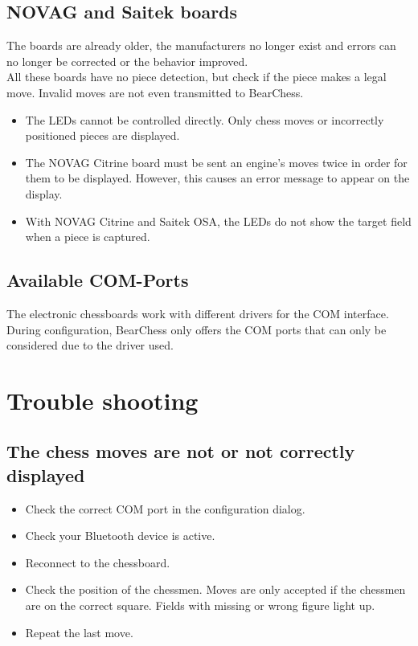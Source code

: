 \documentclass[11pt,a4paper]{article}
\begin{document}
\subsection{NOVAG and Saitek boards}
The boards are already older, the manufacturers no longer exist and errors can no longer be corrected or the behavior improved.\\
All these boards have no piece detection, but check if the piece makes a legal move. Invalid moves are not even transmitted to BearChess.
\begin{itemize}
	\item The LEDs cannot be controlled directly. Only chess moves or incorrectly positioned pieces are displayed.
	\item The NOVAG Citrine board must be sent an engine's moves twice in order for them to be displayed. However, this causes an error message to appear on the display.
	\item With NOVAG Citrine and Saitek OSA, the LEDs do not show the target field when a piece is captured.
\end{itemize}

\subsection{Available COM-Ports}
The electronic chessboards work with different drivers for the COM interface. During configuration, BearChess only offers the COM ports that can only be considered due to the driver used.

\section{Trouble shooting}

\subsection{The chess moves are not or not correctly displayed}
\begin{itemize}
	\item Check the correct COM port in the configuration dialog.
	\item Check your Bluetooth device is active.	
	\item Reconnect to the chessboard.	
	\item Check the position of the chessmen. Moves are only accepted if the chessmen are on the correct square. Fields with missing or wrong figure light up.
	\item Repeat the last move.
\end{itemize}
\end{document}
